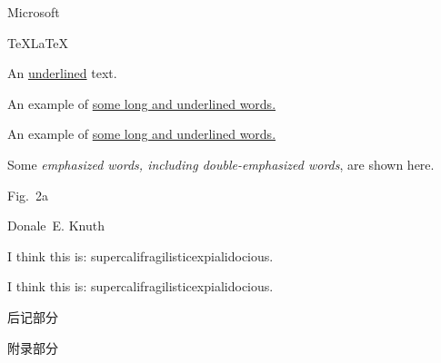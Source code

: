 \documentclass[10pt,a4paper]{book}
\begin{document}
	\textregistered{} \qquad Microsoft\texttrademark
	
	\TeX \qquad \LaTeX \qquad \LaTeXe
	
	An \underline{underlined} text.
	
	An example of \underline{some long and underlined words.}
	
	An example of \uline{some long and underlined words.}
	
	Some \emph{emphasized words, including \emph{double-emphasized} words}, are shown here.
	
	Fig.~2a
	
	Donale~E. Knuth
	
	I think this is: supercalifragilisticexpialidocious.
	
	I think this is: su\-per\-cal\-i\-frag\-i\-lis\-tic\-ex\-pi\-al\-i\-do\-cious.
	
	\backmatter
	后记部分
	
	\appendix
	附录部分
	
\end{document}
